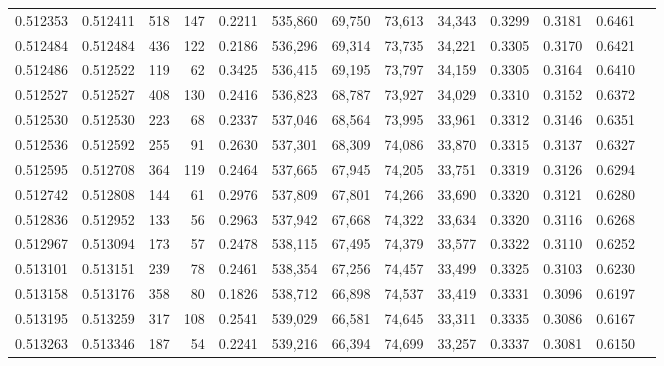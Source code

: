\begin{tabular}{rrrrrrrrrrrrr}
0.512353 & 0.512411 &   518 &   147 &                                     0.2211 & 535,860 &  69,750 &  73,613 &  34,343 & 0.3299 & 0.3181 & 0.6461 \\
0.512484 & 0.512484 &   436 &   122 &                                     0.2186 & 536,296 &  69,314 &  73,735 &  34,221 & 0.3305 & 0.3170 & 0.6421 \\
0.512486 & 0.512522 &   119 &    62 &                                     0.3425 & 536,415 &  69,195 &  73,797 &  34,159 & 0.3305 & 0.3164 & 0.6410 \\
0.512527 & 0.512527 &   408 &   130 &                                     0.2416 & 536,823 &  68,787 &  73,927 &  34,029 & 0.3310 & 0.3152 & 0.6372 \\
0.512530 & 0.512530 &   223 &    68 &                                     0.2337 & 537,046 &  68,564 &  73,995 &  33,961 & 0.3312 & 0.3146 & 0.6351 \\
0.512536 & 0.512592 &   255 &    91 &                                     0.2630 & 537,301 &  68,309 &  74,086 &  33,870 & 0.3315 & 0.3137 & 0.6327 \\
0.512595 & 0.512708 &   364 &   119 &                                     0.2464 & 537,665 &  67,945 &  74,205 &  33,751 & 0.3319 & 0.3126 & 0.6294 \\
0.512742 & 0.512808 &   144 &    61 &                                     0.2976 & 537,809 &  67,801 &  74,266 &  33,690 & 0.3320 & 0.3121 & 0.6280 \\
0.512836 & 0.512952 &   133 &    56 &                                     0.2963 & 537,942 &  67,668 &  74,322 &  33,634 & 0.3320 & 0.3116 & 0.6268 \\
0.512967 & 0.513094 &   173 &    57 &                                     0.2478 & 538,115 &  67,495 &  74,379 &  33,577 & 0.3322 & 0.3110 & 0.6252 \\
0.513101 & 0.513151 &   239 &    78 &                                     0.2461 & 538,354 &  67,256 &  74,457 &  33,499 & 0.3325 & 0.3103 & 0.6230 \\
0.513158 & 0.513176 &   358 &    80 &                                     0.1826 & 538,712 &  66,898 &  74,537 &  33,419 & 0.3331 & 0.3096 & 0.6197 \\
0.513195 & 0.513259 &   317 &   108 &                                     0.2541 & 539,029 &  66,581 &  74,645 &  33,311 & 0.3335 & 0.3086 & 0.6167 \\
0.513263 & 0.513346 &   187 &    54 &                                     0.2241 & 539,216 &  66,394 &  74,699 &  33,257 & 0.3337 & 0.3081 & 0.6150 \\

\end{tabular}
